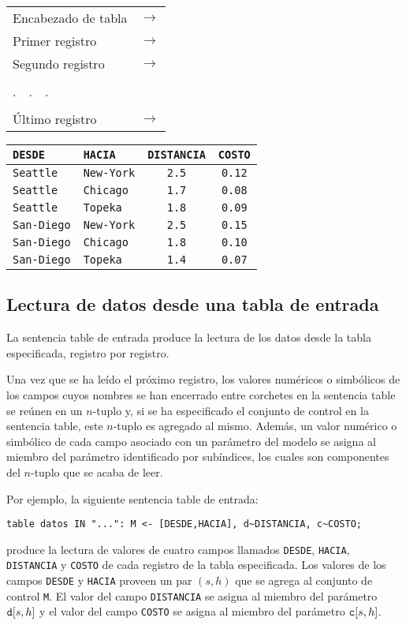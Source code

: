 \documentclass[11pt,spanish]{report}
\begin{document}
\begin{tabular}{ll@{}}
Encabezado de tabla&$\rightarrow$\\
Primer registro&$\rightarrow$\\
Segundo registro&$\rightarrow$\\
\\
\hfil .\ \ .\ \ .\\
\\
Último registro&$\rightarrow$\\
\end{tabular}
\begin{tabular}{|l|l|c|c|}
\hline
{\tt DESDE}&{\tt HACIA}&{\tt DISTANCIA}&{\tt COSTO}\\
\hline
{\tt Seattle}  &{\tt New-York}&{\tt 2.5}&{\tt 0.12}\\
{\tt Seattle}  &{\tt Chicago} &{\tt 1.7}&{\tt 0.08}\\
{\tt Seattle}  &{\tt Topeka}  &{\tt 1.8}&{\tt 0.09}\\
{\tt San-Diego}&{\tt New-York}&{\tt 2.5}&{\tt 0.15}\\
{\tt San-Diego}&{\tt Chicago} &{\tt 1.8}&{\tt 0.10}\\
{\tt San-Diego}&{\tt Topeka}  &{\tt 1.4}&{\tt 0.07}\\
\hline
\end{tabular}

\subsection{Lectura de datos desde una tabla de entrada}

La sentencia table de entrada produce la lectura de los datos desde la tabla especificada, registro por registro.

Una vez que se ha leído el próximo registro, los valores numéricos o simbólicos de los campos cuyos nombres se han encerrado entre corchetes en la sentencia table se reúnen en un $n$-tuplo y, si se ha especificado el conjunto de control en la sentencia table, este $n$-tuplo es agregado al mismo. Además, un valor numérico o simbólico de cada campo asociado con un parámetro del modelo se asigna al miembro del parámetro identificado por subíndices, los cuales son componentes del $n$-tuplo que se acaba de leer.

Por ejemplo, la siguiente sentencia table de entrada:

\noindent\hfil
\verb|table datos IN "...": M <- [DESDE,HACIA], d~DISTANCIA, c~COSTO;|

\noindent
produce la lectura de valores de cuatro campos llamados {\tt DESDE}, {\tt HACIA}, {\tt DISTANCIA} y {\tt COSTO} de cada registro de la tabla especificada. Los valores de los campos {\tt DESDE} y {\tt HACIA} proveen un par $(s,h)$ que se agrega al conjunto de control {\tt M}. El valor del campo {\tt DISTANCIA} se asigna al miembro del parámetro ${\tt d}[s,h]$ y el valor del campo {\tt COSTO} se asigna al miembro del parámetro ${\tt c}[s,h]$.
\end{document}
